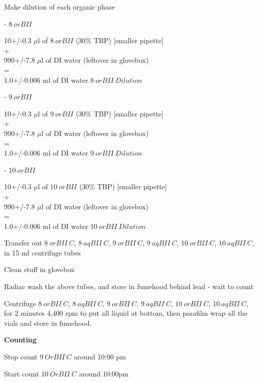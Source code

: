 \documentclass[idxtotoc,hyperref,openany,oneside]{labbook} %
\newcommand{\cmark}{\ding{51}}%
\newcommand{\done}{\rlap{$\square$}{\raisebox{2pt}{\large\hspace{1pt}\cmark}}%
  \hspace{-2.5pt}}
\begin{document}
\begin{todolist}
\item[\done]{Make dilution of each organic phase}
  \begin{todolist}
  \item[\done]{- $\boxed{8\ orBII}$}
  \end{todolist}
  \begin{center}
    10+/-0.3 $\mu$l of $\boxed{8\ orBII}$
    (30\% TBP) [smaller pipette]\\
    +\\
    990+/-7.8 $\mu$l of DI water (leftover in glovebox)\\
    =\\
    1.0+/-0.006 ml of DI water $\boxed{8\ orBII\ Dilution}$
  \end{center}
  \begin{todolist}
  \item[\done]{- $\boxed{9\ orBII}$}
  \end{todolist}
  \begin{center}
    10+/-0.3 $\mu$l of $\boxed{9\ orBII}$
    (30\% TBP) [smaller pipette]\\
    +\\
    990+/-7.8 $\mu$l of DI water (leftover in glovebox)\\
    =\\
    1.0+/-0.006 ml of DI water $\boxed{9\ orBII\ Dilution}$
  \end{center}
  \begin{todolist}
  \item[\done]{- $\boxed{10\ orBII}$}
  \end{todolist}
  \begin{center}
    10+/-0.3 $\mu$l of $\boxed{10\ orBII}$
    (30\% TBP) [smaller pipette]\\
    +\\
    990+/-7.8 $\mu$l of DI water (leftover in glovebox)\\
    =\\
    1.0+/-0.006 ml of DI water $\boxed{10\ orBII\ Dilution}$
  \end{center}
 
\item[\done]{Transfer out $\boxed{8\ orBII\ C}$, $\boxed{8\ aqBII\ C}$,
  $\boxed{9\ orBII\ C}$, $\boxed{9\ aqBII\ C}$, $\boxed{10\ orBII\ C}$,
  $\boxed{10\ aqBII\ C}$, in 15 ml centrifuge tubes}
\item{Clean stuff in glovebox}
\item[\done]{Radiac wash the above tubes, and store in fumehood behind
  lead - wait to count}
\item[\done]{Centrifuge $\boxed{8\ orBII\ C}$, $\boxed{8\ aqBII\ C}$,
  $\boxed{9\ orBII\ C}$, $\boxed{9\ aqBII\ C}$, $\boxed{10\ orBII\ C}$,
  $\boxed{10\ aqBII\ C}$, for 2 minutes 4,400 rpm to put all liquid at
  bottom, then parafilm wrap all the vials and store in fumehood.}
\end{todolist}
\textbf{Counting}
\begin{todolist}
\item[\done]{Stop count $\boxed{9\ OrBII\ C}$ around 10:00 pm}
\item[\done]{Start count $\boxed{10\ OrBII\ C}$ around 10:00pm}
\end{todolist}
\end{document}
